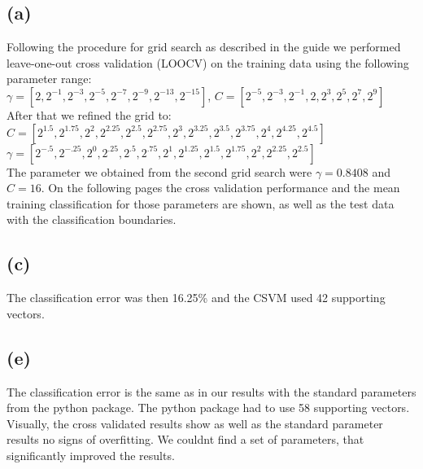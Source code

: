 \documentclass[11pt,a4paper]{article}
\begin{document}
\subsection*{(a)}
Following the procedure for grid search as described in the guide we performed leave-one-out cross validation (LOOCV) on the training data using the following parameter range:\\
$ \gamma = [2,2^{-1},2^{-3},2^{-5},2^{-7},2^{-9},2^{-13},2^{-15}] $, $ C = [2^{-5},2^{-3},2^{-1},2,2^{3},2^{5},2^{7},2^9]$\\
After that we refined the grid to:\\
$C = [2^{1.5},2^{1.75},2^2,2^{2.25},2^{2.5},2^{2.75},2^{3},2^{3.25},2^{3.5},2^{3.75},2^4,2^{4.25},2^{4.5}]$\\
$\gamma = [2^{-.5},2^{-.25},2^0,2^{.25},2^{.5},2^{.75},2^1,2^{1.25},2^{1.5},2^{1.75},2^2,2^{2.25},2^{2.5}]$\\
The parameter we obtained from the second grid search were $\gamma=0.8408$ and $C=16$. On the following pages the cross validation performance and the mean training classification for those parameters are shown, as well as the test data with the classification boundaries.
\subsection*{(c)}
The classification error was then 16.25\% and the CSVM used 42 supporting vectors.
\subsection*{(e)}
The classification error is the same as in our results with the standard parameters from the python package. The python package had to use 58 supporting vectors. Visually, the cross validated results show as well as the standard parameter results no signs of overfitting. We couldnt find a set of parameters, that significantly improved the results.
\end{document}
